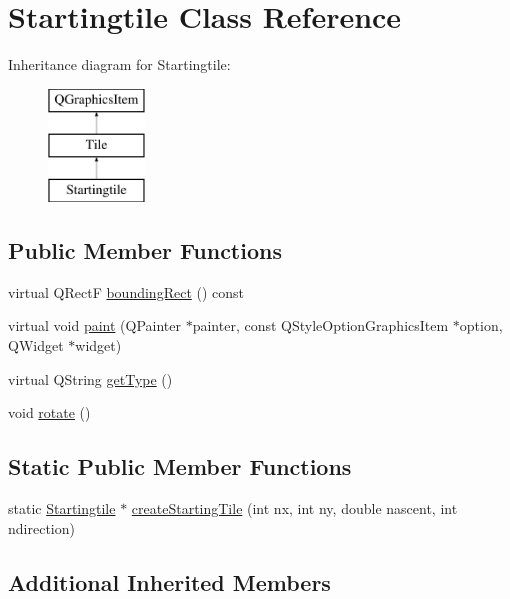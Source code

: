 \hypertarget{class_startingtile}{}\section{Startingtile Class Reference}
\label{class_startingtile}
Inheritance diagram for Startingtile\+:\begin{figure}[H]
\begin{center}
\leavevmode
\includegraphics[height=3.000000cm]{class_startingtile}
\end{center}
\end{figure}
\subsection*{Public Member Functions}
\begin{DoxyCompactItemize}
\item 
virtual Q\+RectF \mbox{\hyperlink{class_startingtile_adfdbbb769775bf4a71f42795a3ca5cc7}{bounding\+Rect}} () const
\item 
virtual void \mbox{\hyperlink{class_startingtile_a125d0c3c2c814103a172c08180258d17}{paint}} (Q\+Painter $\ast$painter, const Q\+Style\+Option\+Graphics\+Item $\ast$option, Q\+Widget $\ast$widget)
\item 
virtual Q\+String \mbox{\hyperlink{class_startingtile_af9014bd47962800743b2057b520546d7}{get\+Type}} ()
\item 
void \mbox{\hyperlink{class_startingtile_aa2a399114844375bb6900b87f39ad946}{rotate}} ()
\end{DoxyCompactItemize}
\subsection*{Static Public Member Functions}
\begin{DoxyCompactItemize}
\item 
static \mbox{\hyperlink{class_startingtile}{Startingtile}} $\ast$ \mbox{\hyperlink{class_startingtile_a802644c93a230d81ba5a21c87866a411}{create\+Starting\+Tile}} (int nx, int ny, double nascent, int ndirection)
\end{DoxyCompactItemize}
\subsection*{Additional Inherited Members}


